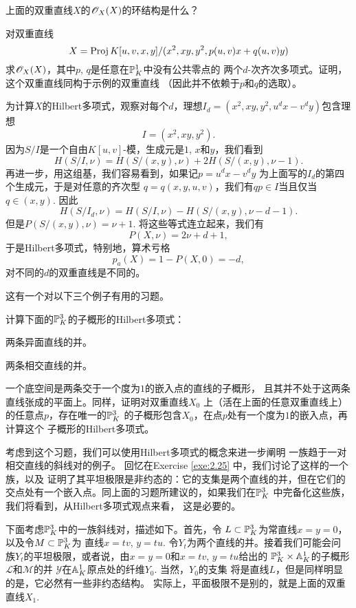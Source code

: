 \begin{exe}\label{exe:3.64}
上面的双重直线$X$的$\oo_X(X)$的环结构是什么？
\end{exe}

\begin{exe}\label{exe:3.65}
对双重直线
\[
	X=\proj K[u,v,x,y]/(x^2,xy,y^2,p(u,v)x+q(u,v)y)
\]
求$\oo_X(X)$，其中$p$, $q$是任意在$\P_K^1$中没有公共零点的
两个$d$-次齐次多项式。证明，这个双重直线同构于示例的双重直线
（因此并不依赖于$p$和$q$的选取）。
\end{exe}

为计算$X$的Hilbert多项式，观察对每个$d$，理想$I_d=(x^2,xy,y^2,
u^dx-v^dy)$包含理想
\[
	I=(x^2,xy,y^2).
\]
因为$S/I$是一个自由$K[u,v]$-模，生成元是$1$, $x$和$y$，我们看到
\[
	H(S/I,\nu)=H(S/(x,y),\nu)+2H(S/(x,y),\nu-1).
\]
再进一步，用这组基，我们容易看到，如果记$p=u^dx-v^dy$
为上面写的$I_d$的第四个生成元，于是对任意的齐次型
$q=q(x,y,u,v)$，我们有$qp\in I$当且仅当$q\in (x,y)$. 因此
\[
	H(S/I_d,\nu)=H(S/I,\nu)-H(S/(x,y),\nu-d-1).
\]
但是$P(S/(x,y),\nu)=\nu+1$. 将这些等式连立起来，我们有
\[
	P(X,\nu)=2\nu+d+1,
\]
于是Hilbert多项式，特别地，算术亏格
\[
	p_a(X)=1-P(X,0)=-d,
\]
对不同的$d$的双重直线是不同的。

这有一个对以下三个例子有用的习题。


\begin{exe}\label{exe:3.66}
计算下面的$\P_K^3$的子概形的Hilbert多项式：
\begin{compactenum}[(a)]
\item 两条异面直线的并。
\item 两条相交直线的并。
\item 一个底空间是两条交于一个度为$1$的嵌入点的直线的子概形，
且其并不处于这两条直线张成的平面上。同样，证明对双重直线$X_0$
上（活在上面的任意双重直线上）的任意点$p$，存在唯一的$\P_K^3$
的子概形包含$X_0$，在点$p$处有一个度为$1$的嵌入点，再计算这个
子概形的Hilbert多项式。
\end{compactenum}
\end{exe}

考虑到这个习题，我们可以使用Hilbert多项式的概念来进一步阐明
一族趋于一对相交直线的斜线对的例子。
回忆在Exercise \ref{exe:2.25} 中，我们讨论了这样的一个族，以及
证明了其平坦极限是非约态的：它的支集是两个直线的并，但在它们的
交点处有一个嵌入点。同上面的习题所建议的，如果我们在$\P_K^3$
中完备化这些族，我们将看到，从Hilbert多项式观点来看，
这是必要的。

下面考虑$\P_K^3$中的一族斜线对，描述如下。首先，令
$L\subset \P_K^3$为常直线$x=y=0$，以及令$M\subset \P_K^3$为
直线$x=tv$, $y=tu$. 令$Y_t$为两个直线的并。接着我们可能会问
族$Y_t$的平坦极限，或者说，由$x=y=0$和$x=tv$, $y=tu$给出的
$\P_K^3\times \A_K^1$的子概形$\mathscr L$和$\mathscr M$的并
$\mathscr Y$在$\A_K^1$原点处的纤维$Y_0$. 当然，$Y_0$的支集
将是直线$L$，但是同样明显的是，它必然有一些非约态结构。
实际上，平面极限不是别的，就是上面的双重直线$X_1$.

